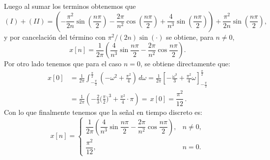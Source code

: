 \documentclass[
  11pt,
  letterpaper,
   addpoints,
   answers
  ]{exam}
\begin{document}
\begin{questions}
\begin{solution}
Luego al sumar los terminos obtenemos que 
\[
(I)+(II)=\left(-\frac{\pi^2}{2n}\sin\!\left(\frac{n\pi}{2}\right)-\frac{2\pi}{n^2}\cos\!\left(\frac{n\pi}{2}\right)+\frac{4}{n^3}\sin\!\left(\frac{n\pi}{2}\right)\right)
+\frac{\pi^2}{2n}\sin\!\left(\frac{n\pi}{2}\right),
\]
y por cancelación del término con $\pi^2/(2n)\sin(\cdot)$ se obtiene, para $n\neq 0$,
\[
x[n]=\frac{1}{2\pi}\left(\frac{4}{n^3}\sin\!\frac{n\pi}{2}-\frac{2\pi}{n^2}\cos\!\frac{n\pi}{2}\right).
\]
Por otro lado tenemos que para el caso $n=0$, se obtiene directamente que: 
\begin{align*}
x[0]
&=\frac{1}{2\pi}\int_{-\frac{\pi}{2}}^{\frac{\pi}{2}}\left(-\omega^2+\frac{\pi^2}{4}\right)\,d\omega
=\frac{1}{2\pi}\left[-\frac{\omega^3}{3}+\frac{\pi^2}{4}\omega\right]_{-\frac{\pi}{2}}^{\frac{\pi}{2}}\\[1mm]
&=\frac{1}{2\pi}\left(-\frac{2}{3}\Big(\tfrac{\pi}{2}\Big)^3+\frac{\pi^2}{4}\cdot\pi\right)
=\boxed{\,x[0]=\dfrac{\pi^2}{12}\,}.
\end{align*}
Con lo que finalmente tenemos que la señal en tiempo discreto es:
\[
x[n]=
\begin{cases}
\dfrac{1}{2\pi}\!\left(\dfrac{4}{n^3}\sin\!\dfrac{n\pi}{2}-\dfrac{2\pi}{n^2}\cos\!\dfrac{n\pi}{2}\right), & n\neq 0,\\[3mm]
\dfrac{\pi^2}{12}, & n=0.
\end{cases}
\]

\begin{figure}[H]
\centering
{}
\end{figure}
\end{solution}
\end{questions}
\end{document}
